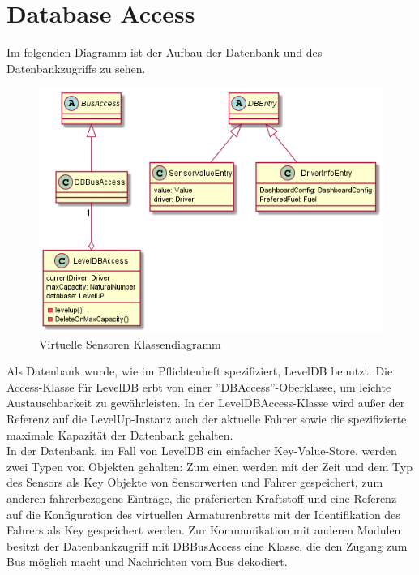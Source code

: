\documentclass[entwurf.tex]{subfiles}
\begin{document}
  	\section{Database Access}
  		Im folgenden Diagramm ist der Aufbau der Datenbank und des Datenbankzugriffs zu sehen.
  		\begin{figure}[H]
  			\begin{center}
 				\includegraphics[height=0.8\textheight]{diagrams/DBAccess.png}
  				\caption{Virtuelle Sensoren Klassendiagramm}
  			\end{center}
  		\end{figure}
  	Als Datenbank wurde, wie im Pflichtenheft spezifiziert, LevelDB benutzt. Die Access-Klasse für LevelDB erbt von einer ''DBAccess''-Oberklasse, um leichte Austauschbarkeit zu gewährleisten. In der LevelDBAccess-Klasse wird außer der Referenz auf die LevelUp-Instanz auch der aktuelle Fahrer sowie die spezifizierte maximale Kapazität der Datenbank gehalten. \\ In der Datenbank, im Fall von LevelDB ein einfacher Key-Value-Store, werden zwei Typen von Objekten gehalten: Zum einen werden mit der Zeit und dem Typ des Sensors als Key Objekte von Sensorwerten und Fahrer gespeichert, zum anderen fahrerbezogene Einträge, die präferierten Kraftstoff und eine Referenz auf die Konfiguration des virtuellen Armaturenbretts mit der Identifikation des Fahrers als Key gespeichert werden. Zur Kommunikation mit anderen Modulen besitzt der Datenbankzugriff mit DBBusAccess eine Klasse, die den Zugang zum Bus möglich macht und Nachrichten vom Bus dekodiert. 
  	

	\newpage
\end{document}
